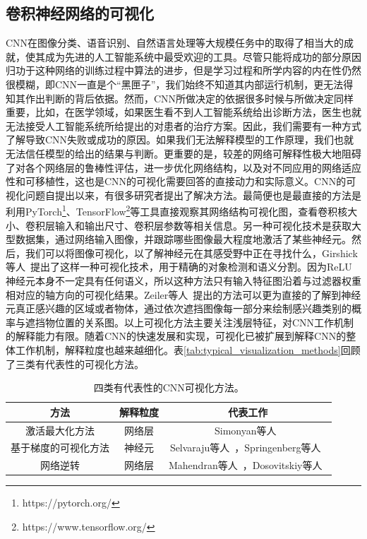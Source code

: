 \subsection{卷积神经网络的可视化}\label{subsec:visulization_methods}
CNN在图像分类、语音识别、自然语言处理等大规模任务中的取得了相当大的成就，使其成为先进的人工智能系统中最受欢迎的工具。尽管只能将成功的部分原因归功于这种网络的训练过程中算法的进步，但是学习过程和所学内容的内在性仍然很模糊，即CNN一直是个“黑匣子”，我们始终不知道其内部运行机制，更无法得知其作出判断的背后依据。然而，CNN所做决定的依据很多时候与所做决定同样重要，比如，在医学领域，如果医生看不到人工智能系统给出诊断方法，医生也就无法接受人工智能系统所给提出的对患者的治疗方案。因此，我们需要有一种方式了解导致CNN失败或成功的原因。如果我们无法解释模型的工作原理，我们也就无法信任模型的给出的结果与判断。更重要的是，较差的网络可解释性极大地阻碍了对各个网络层的鲁棒性评估，进一步优化网络结构，以及对不同应用的网络适应性和可移植性，这也是CNN的可视化需要回答的直接动力和实际意义。CNN的可视化问题自提出以来，有很多研究者提出了解决方法。最简便也是最直接的方法是利用PyTorch\footnote{https://pytorch.org/}、TensorFlow\footnote{https://www.tensorflow.org/}等工具直接观察其网络结构可视化图，查看卷积核大小、卷积层输入和输出尺寸、卷积层参数等相关信息。另一种可视化技术是获取大型数据集，通过网络输入图像，并跟踪哪些图像最大程度地激活了某些神经元。然后，我们可以将图像可视化，以了解神经元在其感受野中正在寻找什么，Girshick等人~\cite{girshick2014rich}提出了这样一种可视化技术，用于精确的对象检测和语义分割。因为ReLU神经元本身不一定具有任何语义，所以这种方法只有输入特征图沿着与过滤器权重相对应的轴方向的可视化结果。Zeiler等人~\cite{zeiler2014visualizing}提出的方法可以更为直接的了解到神经元真正感兴趣的区域或者物体，通过依次遮挡图像每一部分来绘制感兴趣类别的概率与遮挡物位置的关系图。以上可视化方法主要关注浅层特征，对CNN工作机制的解释能力有限。随着CNN的快速发展和实现，可视化已被扩展到解释CNN的整体工作机制，解释粒度也越来越细化。表\ref{tab:typical_visualization_methods}回顾了三类有代表性的可视化方法。
\begin{table}[h]
	\centering
	\caption[四类有代表性的CNN可视化方法]{四类有代表性的CNN可视化方法。}
	\label{tab:typical_visualization_methods}
	\begin{tabular}{c|c|c}
		\toprule[2pt]
		方法 & 解释粒度 & 代表工作 \\ \midrule[2pt]
		激活最大化方法 & 网络层  & Simonyan等人~\cite{simonyan2013deep}  \\\hline
		基于梯度的可视化方法 &  神经元 & Selvaraju等人~\cite{selvaraju2017grad}，Springenberg等人~\cite{springenberg2014striving} \\  \hline
		网络逆转 & 网络层 &Mahendran等人~\cite{mahendran2015understanding, mahendran2016visualizing}，Dosovitskiy等人~\cite{dosovitskiy2016inverting}\\
		\bottomrule[2pt]
	\end{tabular}
	\label{tab:four_visulization_types}
\end{table}
